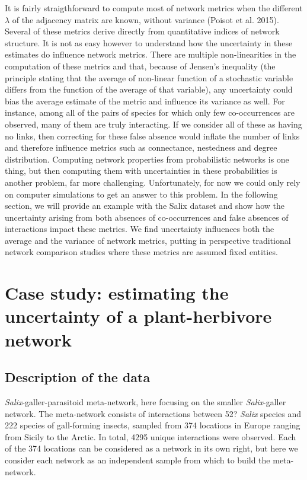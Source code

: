 \documentclass[12pt]{article}
\begin{document}
It is fairly straigthforward to compute most of network metrics when the different $\lambda$ of the adjacency matrix are known, without variance (Poisot et al. 2015). Several of these metrics derive directly from quantitative indices of network structure. It is not as easy however to understand how the uncertainty in these estimates do influence network metrics. There are multiple non-linearities in the computation of these metrics and that, because of Jensen's inequality (the principle stating that the average of non-linear function of a stochastic variable differs from the function of the average of that variable), any uncertainty could bias the average estimate of the metric and influence its variance as well. For instance, among all of the pairs of species for which only few co-occurrences are observed, many of them are truly interacting. If we consider all of these as having no links, then correcting for these false absence would inflate the number of links and therefore influence metrics such as connectance, nestedness and degree distribution. Computing network properties from probabilistic networks is one thing, but then computing them with uncertainties in these probabilities is another problem, far more challenging. Unfortunately, for now we could only rely on computer simulations to get an answer to this problem. In the following section, we will provide an example with the Salix dataset and show how the uncertainty arising from both absences of co-occurrences and false absences of interactions impact these metrics. We find uncertainty influences both the average and the variance of network metrics, putting in perspective traditional network comparison studies where these metrics are assumed fixed entities. 

\section*{Case study: estimating the uncertainty of a plant-herbivore network}

    \subsection*{Description of the data}

      \emph{Salix}-galler-parasitoid meta-network, here focusing on the smaller \emph{Salix}-galler network. The meta-network consists of interactions between 52? \emph{Salix} species and 222 species of gall-forming insects, sampled from 374 locations in Europe ranging from Sicily to the Arctic. In total, 4295 unique interactions were observed. Each of the 374 locations can be considered as a network in its own right, but here we consider each network as an independent sample from which to build the meta-network.
\end{document}

